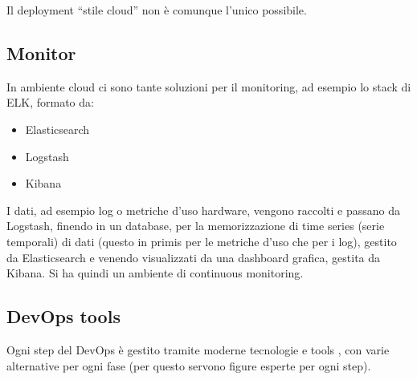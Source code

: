Il deployment “stile cloud” non è comunque l'unico possibile.
\subsection{Monitor}
In ambiente cloud ci sono tante soluzioni per il monitoring, ad esempio lo stack
di ELK, formato da:
\begin{itemize}
    \item Elasticsearch
    \item Logstash
    \item Kibana
\end{itemize}

I dati, ad esempio log o metriche d'uso hardware, vengono raccolti e passano da
Logstash, finendo in un database, per la memorizzazione di time series (serie temporali)
di dati (questo in primis per le metriche d'uso che per i log), gestito da Elasticsearch
e venendo visualizzati da una dashboard grafica, gestita da Kibana. Si ha quindi
un ambiente di continuous monitoring.
\subsection{DevOps tools}
Ogni step del DevOps è gestito tramite moderne tecnologie e tools , con varie
alternative per ogni fase (per questo servono figure esperte per ogni step).
